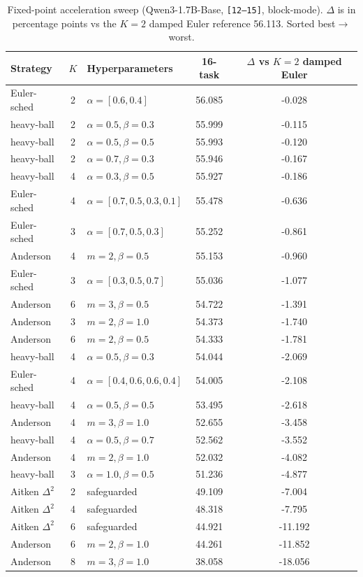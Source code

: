 \begin{table}[h]
\centering
\footnotesize
\caption{Fixed-point acceleration sweep (Qwen3-1.7B-Base, \texttt{[12--15]}, block-mode). $\Delta$ is in percentage points vs the $K{=}2$ damped Euler reference 56.113. Sorted best$\to$worst.}
\label{tab:phase6}
\begin{tabular}{lclcc}
\toprule
Strategy & $K$ & Hyperparameters & 16-task & $\Delta$ vs $K{=}2$ damped Euler \\
\midrule
Euler-sched     & 2 & $\alpha{=}[0.6,0.4]$       & 56.085 & -0.028 \\
heavy-ball      & 2 & $\alpha{=}0.5,\beta{=}0.3$ & 55.999 & -0.115 \\
heavy-ball      & 2 & $\alpha{=}0.5,\beta{=}0.5$ & 55.993 & -0.120 \\
heavy-ball      & 2 & $\alpha{=}0.7,\beta{=}0.3$ & 55.946 & -0.167 \\
heavy-ball      & 4 & $\alpha{=}0.3,\beta{=}0.5$ & 55.927 & -0.186 \\
Euler-sched     & 4 & $\alpha{=}[0.7,0.5,0.3,0.1]$ & 55.478 & -0.636 \\
Euler-sched     & 3 & $\alpha{=}[0.7,0.5,0.3]$    & 55.252 & -0.861 \\
Anderson        & 4 & $m{=}2,\beta{=}0.5$        & 55.153 & -0.960 \\
Euler-sched     & 3 & $\alpha{=}[0.3,0.5,0.7]$    & 55.036 & -1.077 \\
Anderson        & 6 & $m{=}3,\beta{=}0.5$        & 54.722 & -1.391 \\
Anderson        & 3 & $m{=}2,\beta{=}1.0$        & 54.373 & -1.740 \\
Anderson        & 6 & $m{=}2,\beta{=}0.5$        & 54.333 & -1.781 \\
heavy-ball      & 4 & $\alpha{=}0.5,\beta{=}0.3$ & 54.044 & -2.069 \\
Euler-sched     & 4 & $\alpha{=}[0.4,0.6,0.6,0.4]$& 54.005 & -2.108 \\
heavy-ball      & 4 & $\alpha{=}0.5,\beta{=}0.5$ & 53.495 & -2.618 \\
Anderson        & 4 & $m{=}3,\beta{=}1.0$        & 52.655 & -3.458 \\
heavy-ball      & 4 & $\alpha{=}0.5,\beta{=}0.7$ & 52.562 & -3.552 \\
Anderson        & 4 & $m{=}2,\beta{=}1.0$        & 52.032 & -4.082 \\
heavy-ball      & 3 & $\alpha{=}1.0,\beta{=}0.5$ & 51.236 & -4.877 \\
Aitken $\Delta^2$ & 2 & safeguarded             & 49.109 & -7.004 \\
Aitken $\Delta^2$ & 4 & safeguarded             & 48.318 & -7.795 \\
Aitken $\Delta^2$ & 6 & safeguarded             & 44.921 & -11.192 \\
Anderson        & 6 & $m{=}2,\beta{=}1.0$        & 44.261 & -11.852 \\
Anderson        & 8 & $m{=}3,\beta{=}1.0$        & 38.058 & -18.056 \\
\bottomrule
\end{tabular}
\end{table}

